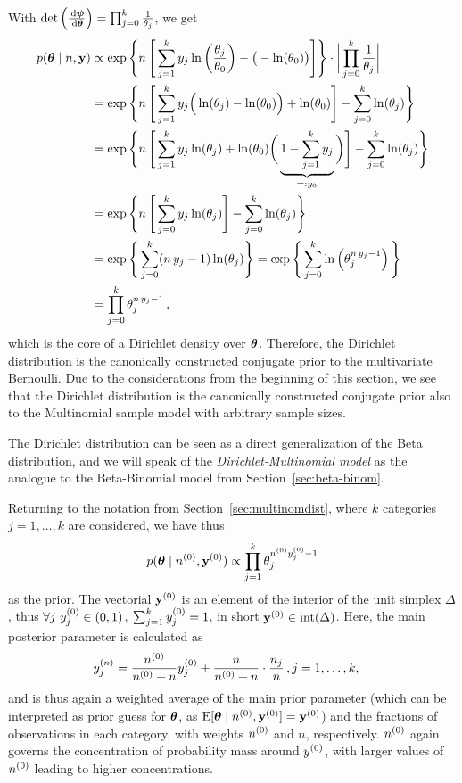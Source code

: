 With $\det\left(\frac{\,\mathrm{d}\boldsymbol{\psi}}{\,\mathrm{d}\boldsymbol{\theta}}\right) = \prod_{j=0}^k \frac{1}{\theta_j}$, we get
\begin{align*}
p(\boldsymbol{\theta}\mid n,\mathbf{y})
 &\propto \exp\Bigg\{n\, \Bigg[ \sum_{j=1}^k y_j \ln\bigg(\frac{\theta_j}{\theta_0}\bigg) - \big(-\ln(\theta_0)\big) \Bigg] \Bigg\}
  \cdot \bigg| \prod_{j=0}^k \frac{1}{\theta_j} \bigg| \\
 &=       \exp\Bigg\{n\, \Bigg[ \sum_{j=1}^k y_j \Big(\ln(\theta_j)-\ln(\theta_0)\Big) + \ln(\theta_0) \Bigg]
                         - \sum_{j=0}^k \ln(\theta_j) \Bigg\} \\
 &=       \exp\Bigg\{n\, \Bigg[ \sum_{j=1}^k y_j \ln(\theta_j) + \ln(\theta_0) \bigg(\underbrace{1 - \sum_{j=1}^k  y_j}_{=: y_0}\bigg) \Bigg]
                         - \sum_{j=0}^k \ln(\theta_j) \Bigg\} \\
 &=       \exp\Bigg\{n\, \Bigg[ \sum_{j=0}^k y_j \ln(\theta_j) \Bigg] - \sum_{j=0}^k \ln(\theta_j) \Bigg\} \\
 &=       \exp\Bigg\{\sum_{j=0}^k (n\,y_j -1 ) \ln(\theta_j) \Bigg\}
  =       \exp\Bigg\{\sum_{j=0}^k \ln\left(\theta_j^{n\,y_j -1}\right) \Bigg\}\\
 &= \prod_{j=0}^k \theta_j^{n\,y_j - 1}\,,
\end{align*}
which is the core of a Dirichlet density over $\boldsymbol{\theta}$.
Therefore, the Dirichlet distribution is the canonically constructed conjugate prior to the multivariate Bernoulli.
Due to the considerations from the beginning of this section,
we see that the Dirichlet distribution is the canonically constructed conjugate prior
also to the Multinomial sample model with arbitrary sample sizes.

The Dirichlet distribution can be seen as a direct generalization of the Beta distribution,
and we will speak of the \emph{Dirichlet-Multinomial model}
as the analogue to the Beta-Binomial model from Section~\ref{sec:beta-binom}.

Returning to the notation from Section~\ref{sec:multinomdist},
where $k$ categories $j=1,\ldots,k$ are considered, 
we have thus
\begin{align*}
p(\boldsymbol{\theta}\mid n^{(0)},\mathbf{y}^{(0)}) \propto \prod_{j=1}^k \theta_j^{n^{(0)}y^{(0)}_j-1}
\end{align*}
as the prior.
The vectorial $\mathbf{y}^{(0)}$ is an element of the interior of the unit simplex $\Delta$,
thus $\forall j \ y^{(0)}_j \in (0,1)$, $\sum_{j=1}^k y^{(0)}_j = 1$, in short $\mathbf{y}^{(0)} \in \text{int}(\Delta)$.
Here, the main posterior parameter is calculated as
\begin{align*}
y^{(n)}_j &= \frac{n^{(0)}}{n^{(0)}+n} y^{(0)}_j + \frac{n}{n^{(0)}+n} \cdot \frac{n_j}{n}\,, j = 1,\ldots, k,
\end{align*}
and is thus again a weighted average of the main prior parameter
(which can be interpreted as prior guess for $\boldsymbol{\theta}$, as $\operatorname{E}[\boldsymbol{\theta}\mid n^{(0)},\mathbf{y}^{(0)}] = \mathbf{y}^{(0)}$)
and the fractions of observations in each category,
with weights $n^{(0)}$ and $n$, respectively.
$n^{(0)}$ again governs the concentration of probability mass around $y^{(0)}$,
with larger values of $n^{(0)}$ leading to higher concentrations.

